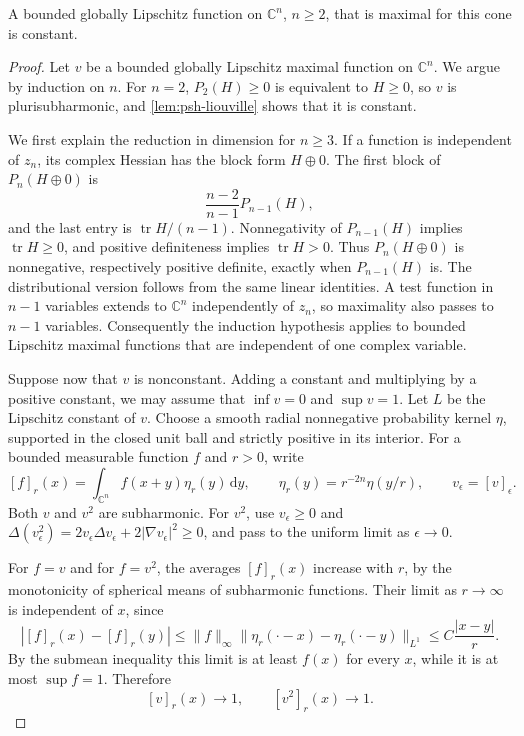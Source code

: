 \begin{theorem}\label{thm:stw-cone-liouville}
A bounded globally Lipschitz function on $\mathbb C^n$, $n\geq2$, that is maximal for this cone is constant.
\end{theorem}
\begin{proof}
Let $v$ be a bounded globally Lipschitz maximal function on $\mathbb C^n$. We argue by induction on $n$. For $n=2$, $P_2(H)\geq0$ is equivalent to $H\geq0$, so $v$ is plurisubharmonic, and \cref{lem:psh-liouville} shows that it is constant.

We first explain the reduction in dimension for $n\geq3$. If a function is independent of $z_n$, its complex Hessian has the block form $H\oplus0$. The first block of $P_n(H\oplus0)$ is
\[
 \frac{n-2}{n-1}P_{n-1}(H),
\]
and the last entry is $\operatorname{tr}H/(n-1)$. Nonnegativity of $P_{n-1}(H)$ implies $\operatorname{tr}H\geq0$, and positive definiteness implies $\operatorname{tr}H>0$. Thus $P_n(H\oplus0)$ is nonnegative, respectively positive definite, exactly when $P_{n-1}(H)$ is. The distributional version follows from the same linear identities. A test function in $n-1$ variables extends to $\mathbb C^n$ independently of $z_n$, so maximality also passes to $n-1$ variables. Consequently the induction hypothesis applies to bounded Lipschitz maximal functions that are independent of one complex variable.

Suppose now that $v$ is nonconstant. Adding a constant and multiplying by a positive constant, we may assume that $\inf v=0$ and $\sup v=1$. Let $L$ be the Lipschitz constant of $v$. Choose a smooth radial nonnegative probability kernel $\eta$, supported in the closed unit ball and strictly positive in its interior. For a bounded measurable function $f$ and $r>0$, write
\[
 [f]_r(x)=\int_{\mathbb C^n}f(x+y)\eta_r(y)\,\mathrm{d}y,
 \qquad \eta_r(y)=r^{-2n}\eta(y/r),\qquad v_\epsilon=[v]_\epsilon.
\]
Both $v$ and $v^2$ are subharmonic. For $v^2$, use $v_\epsilon\geq0$ and
$\Delta(v_\epsilon^2)=2v_\epsilon\Delta v_\epsilon+2|\nabla v_\epsilon|^2\geq0$, and pass to the uniform limit as $\epsilon\to0$.

For $f=v$ and for $f=v^2$, the averages $[f]_r(x)$ increase with $r$, by the monotonicity of spherical means of subharmonic functions. Their limit as $r\to\infty$ is independent of $x$, since
\[
 |[f]_r(x)-[f]_r(y)|
 \leq\|f\|_\infty\|\eta_r(\cdot-x)-\eta_r(\cdot-y)\|_{L^1}
 \leq C\frac{|x-y|}{r}.
\]
By the submean inequality this limit is at least $f(x)$ for every $x$, while it is at most $\sup f=1$. Therefore
\begin{equation}\label{eq:cone-large-averages}
 [v]_r(x)\longrightarrow1,\qquad [v^2]_r(x)\longrightarrow1.
\end{equation}


\end{proof}
